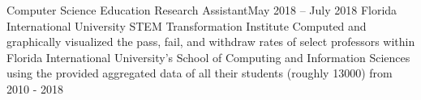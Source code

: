 
\subheading
    {Computer Science Education Research Assistant}{May 2018 -- July 2018}
    {Florida International University STEM Transformation Institute}{}
    \itemListStart
        \listItem{}
            {Computed and graphically visualized the pass, fail, and withdraw rates of select professors within Florida International University’s School of Computing and Information Sciences using the provided aggregated data of all their students (roughly 13000) from 2010 - 2018}
    \itemListEnd